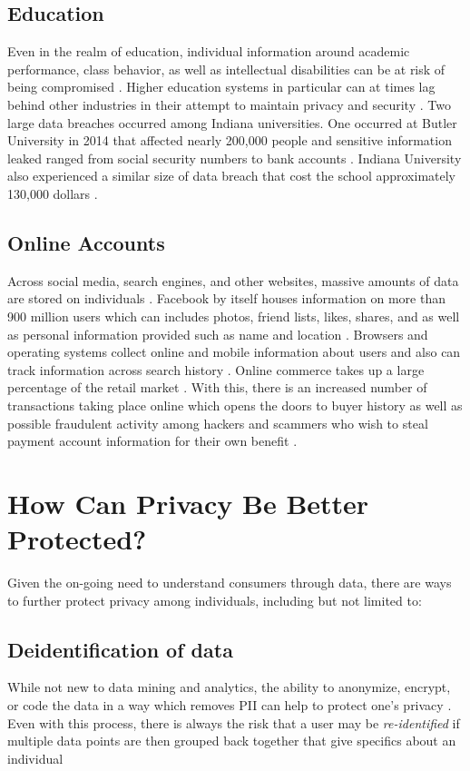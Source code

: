 \documentclass[sigconf]{acmart}
\begin{document}
  \subsection{Education} Even in the realm of education, individual information around academic performance, class behavior, as well as intellectual disabilities can be at risk of being compromised \cite{Bathon2013}. Higher education systems in particular can at times lag behind other industries in their attempt to maintain privacy and security \cite{Daniel2015}. Two large data breaches occurred among Indiana universities. One occurred at Butler University in 2014 that affected nearly 200,000 people and sensitive information leaked ranged from social security numbers to bank accounts \cite{McCarthy2015}. Indiana University also experienced a similar size of data breach that cost the school approximately 130,000 dollars \cite{McCarthy2015}. 
  \subsection{Online Accounts} Across social media, search engines, and other websites, massive amounts of data are stored on individuals \cite{Tene2013}. Facebook by itself houses information on more than 900 million users which can includes photos, friend lists, likes, shares, and as well as personal information provided such as name and location \cite{Tene2013}. Browsers and operating systems collect online and mobile information about users and also can track information across search history \cite{Tene2013}. Online commerce takes up a large percentage of the retail market \cite{Tene2013}. With this, there is an increased number of transactions taking place online which opens the doors to buyer history as well as possible fraudulent activity among hackers and scammers who wish to steal payment account information for their own benefit \cite{Tene2013}. 
\section{How Can Privacy Be Better Protected?}
Given the on-going need to understand consumers through data, there are ways to further protect privacy among individuals, including but not limited to:
 \subsection{Deidentification of data} While not new to data mining and analytics, the ability to anonymize, encrypt, or code the data in a way which removes PII can help to protect one's privacy \cite{Tene2012}. Even with this process, there is always the risk that a user may be \textit{re-identified} if multiple data points are then grouped back together that give specifics about an individual \cite{Francis2014}
\end{document}
